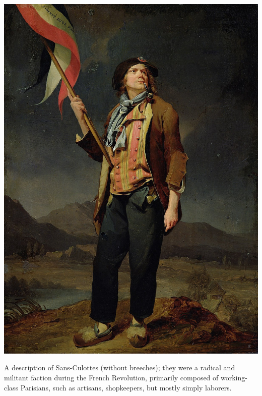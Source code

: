 \begin{marginfigure}
  \includegraphics[scale=0.12]{Sans-culotte.jpg}
  \caption{A description of Sans-Culottes (without breeches); they were a radical and militant faction during the French Revolution, primarily composed of working-class Parisians, such as artisans, shopkeepers, but mostly simply laborers.}\\
  \label{fig:sans_culottes}
\end{marginfigure}

